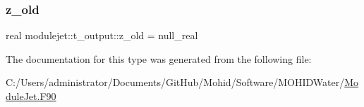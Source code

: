 \mbox{\label{structmodulejet_1_1t__output_ac697512f8b7efe16219e64b6f7d2af24}} 
\subsubsection{\texorpdfstring{z\+\_\+old}{z\_old}}
{\footnotesize\ttfamily real modulejet\+::t\+\_\+output\+::z\+\_\+old = null\+\_\+real\hspace{0.3cm}{\ttfamily [private]}}



The documentation for this type was generated from the following file\+:\begin{DoxyCompactItemize}
\item 
C\+:/\+Users/administrator/\+Documents/\+Git\+Hub/\+Mohid/\+Software/\+M\+O\+H\+I\+D\+Water/\mbox{\hyperlink{_module_jet_8_f90}{Module\+Jet.\+F90}}\end{DoxyCompactItemize}

